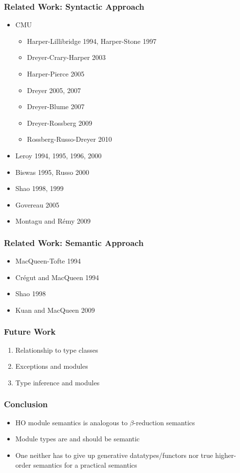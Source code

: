 \documentclass{beamer}
\begin{document}
	\begin{frame}
		\frametitle{Related Work: Syntactic Approach}
		\begin{itemize}
			\item CMU
		\begin{itemize}
			\item Harper-Lillibridge 1994, Harper-Stone 1997
			\item Dreyer-Crary-Harper 2003
			\item Harper-Pierce 2005
			\item Dreyer 2005, 2007
			\item Dreyer-Blume 2007
			\item Dreyer-Rossberg 2009
			\item Rossberg-Russo-Dreyer 2010
		\end{itemize}
			\item Leroy 1994, 1995, 1996, 2000
			\item Biswas 1995, Russo 2000
			\item Shao 1998, 1999
			\item Govereau 2005
			\item Montagu and R\'emy 2009
		\end{itemize}
	\end{frame}
		
	\begin{frame}
		\frametitle{Related Work: Semantic Approach}
		\begin{itemize}
			\itemsep=3mm
			\item MacQueen-Tofte 1994
			\item Cr\'egut and MacQueen 1994
			\item Shao 1998
			\item Kuan and MacQueen 2009
		\end{itemize}	
	\end{frame}
	
	\begin{frame}
		\frametitle{Future Work}
		\begin{enumerate}
			\itemsep=1cm
			\item Relationship to type classes
			\item Exceptions and modules
			\item Type inference and modules
		\end{enumerate}
	\end{frame}
		
	\begin{frame}
		\frametitle{Conclusion}
		\begin{itemize}
			\itemsep=4mm
			\item HO module semantics is analogous to $\beta$-reduction semantics
			\item Module types are and should be semantic
			\item One neither has to give up generative datatypes/functors nor true higher-order semantics for a practical semantics
		\end{itemize}
	\end{frame}
	
\end{document}
